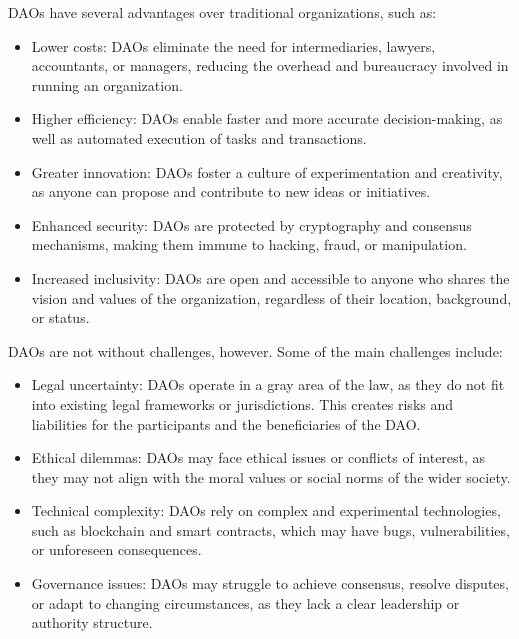\documentclass[lettersize,journal]{IEEEtran}
\begin{document}
DAOs have several advantages over traditional organizations, such as:

\begin{itemize}
\item{Lower costs: DAOs eliminate the need for intermediaries, lawyers, accountants, or managers, reducing the overhead and bureaucracy involved in running an organization.}
\item{Higher efficiency: DAOs enable faster and more accurate decision-making, as well as automated execution of tasks and transactions.}
\item{Greater innovation: DAOs foster a culture of experimentation and creativity, as anyone can propose and contribute to new ideas or initiatives.}
\item{Enhanced security: DAOs are protected by cryptography and consensus mechanisms, making them immune to hacking, fraud, or manipulation.}
\item{Increased inclusivity: DAOs are open and accessible to anyone who shares the vision and values of the organization, regardless of their location, background, or status.}
\end{itemize}

DAOs are not without challenges, however. Some of the main challenges include:

\begin{itemize}
\item{Legal uncertainty: DAOs operate in a gray area of the law, as they do not fit into existing legal frameworks or jurisdictions. This creates risks and liabilities for the participants and the beneficiaries of the DAO.}
\item{Ethical dilemmas: DAOs may face ethical issues or conflicts of interest, as they may not align with the moral values or social norms of the wider society.}
\item{Technical complexity: DAOs rely on complex and experimental technologies, such as blockchain and smart contracts, which may have bugs, vulnerabilities, or unforeseen consequences.}
\item{Governance issues: DAOs may struggle to achieve consensus, resolve disputes, or adapt to changing circumstances, as they lack a clear leadership or authority structure.}
\end{itemize}
\end{document}
